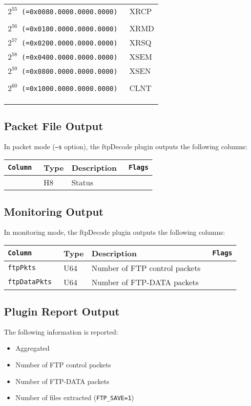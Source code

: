 \documentclass[documentation]{subfiles}
\begin{document}
\begin{minipage}{.48\textwidth}
\begin{longtable}{>{\tt}rl}
        $2^{55}$ (=0x0080.0000.0000.0000) & XRCP\\
        \\
        $2^{56}$ (=0x0100.0000.0000.0000) & XRMD\\
        $2^{57}$ (=0x0200.0000.0000.0000) & XRSQ\\
        $2^{58}$ (=0x0400.0000.0000.0000) & XSEM\\
        $2^{59}$ (=0x0800.0000.0000.0000) & XSEN\\
        \\
        $2^{60}$ (=0x1000.0000.0000.0000) & CLNT\\
        \\
        \\
        \\
        \bottomrule
    \end{longtable}
\end{minipage}

\subsection{Packet File Output}
In packet mode ({\tt --s} option), the ftpDecode plugin outputs the following columns:
\begin{longtable}{>{\tt}lll>{\tt\small}l}
    \toprule
    {\bf Column} & {\bf Type} & {\bf Description} & {\bf Flags}\\
    \midrule\endhead%
    \nameref{ftpStat} & H8 & Status & \\
    \bottomrule
\end{longtable}

\subsection{Monitoring Output}
In monitoring mode, the ftpDecode plugin outputs the following columns:
\begin{longtable}{>{\tt}lll>{\tt\small}l}
    \toprule
    {\bf Column} & {\bf Type} & {\bf Description} & {\bf Flags}\\
    \midrule\endhead%
    ftpPkts     & U64 & Number of FTP control packets & \\
    ftpDataPkts & U64 & Number of FTP-DATA packets    & \\
    \bottomrule
\end{longtable}

\subsection{Plugin Report Output}
The following information is reported:
\begin{itemize}
    \item Aggregated {\tt{}}
    \item Number of FTP control packets
    \item Number of FTP-DATA packets
    \item Number of files extracted ({\tt FTP\_SAVE=1})
\end{itemize}
\end{document}
